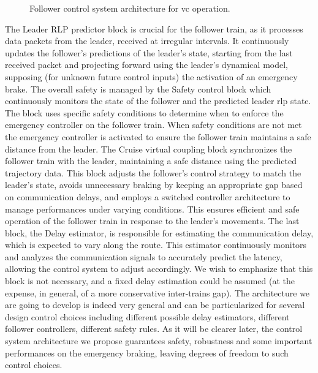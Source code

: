 \documentclass[letterpaper, 10 pt, conference]{ieeeconf}
\theoremstyle{definition}
\theoremstyle{nopoint}
\begin{document}
 
 \begin{figure}[H]
 	\resizebox{\linewidth}{!}{}
 	\caption{Follower control system architecture for \gls{vc} operation. }
 	\label{fig:controlSystem}
 \end{figure}
 
The Leader RLP predictor block is crucial for the follower train, as it processes data packets from the leader, received at irregular intervals. It continuously updates the follower's predictions of the leader's state, starting from the last received packet and projecting forward using the leader’s dynamical model, supposing (for unknown future control inputs) the activation of an emergency brake. The overall safety is managed by the Safety control block which continuously monitors the state of the follower and the predicted leader \gls{rlp} state. The block uses specific safety conditions to determine when to enforce the emergency controller on the follower train. When safety conditions are not met the emergency controller is activated to ensure the follower train maintains a safe distance from the leader. The Cruise virtual coupling block synchronizes the follower train with the leader, maintaining a safe distance using the predicted trajectory data. This block adjusts the follower's control strategy to match the leader's state, avoids unnecessary braking by keeping an appropriate gap based on communication delays, and employs a switched controller architecture to manage performances under varying conditions. This ensures efficient and safe operation of the follower train in response to the leader's movements. The last block, the Delay estimator, is responsible for estimating the communication delay, which is expected to vary along the route. This estimator continuously monitors and analyzes the communication signals to accurately predict the latency, allowing the control system to adjust accordingly. We wish to emphasize that this block is not necessary, and a fixed delay estimation could be assumed (at the expense, in general, of a more conservative inter-trains gap). The architecture we are going to develop is indeed very general and can be particularized for several design control choices including different possible delay estimators, different follower controllers, different safety rules. As it will be clearer later, the control system architecture we propose guarantees safety, robustness and some important performances on the emergency braking, leaving degrees of freedom to such control choices.
 
\end{document}

